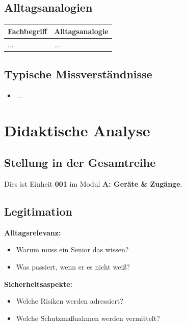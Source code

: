 \documentclass[11pt,a4paper]{article}
\newcommand{\einheitnummer}{001}                    %
\newcommand{\modulname}{Geräte \& Zugänge}          %
\newcommand{\modulbuchstabe}{A}
\begin{document}
\subsection{Alltagsanalogien}

\begin{tabular}{|l|l|}
\hline
\textbf{Fachbegriff} & \textbf{Alltagsanalogie} \\
\hline
... & ... \\
\hline
\end{tabular}

\subsection{Typische Missverständnisse}

\begin{itemize}
    \item ...
\end{itemize}

\section{Didaktische Analyse}

\subsection{Stellung in der Gesamtreihe}

Dies ist Einheit \textbf{\einheitnummer} im Modul \textbf{\modulbuchstabe: \modulname}.


\subsection{Legitimation}

\textbf{Alltagsrelevanz:}
\begin{itemize}
    \item Warum muss ein Senior das wissen?
    \item Was passiert, wenn er es nicht weiß?
\end{itemize}

\textbf{Sicherheitsaspekte:}
\begin{itemize}
    \item Welche Risiken werden adressiert?
    \item Welche Schutzmaßnahmen werden vermittelt?
\end{itemize}
\end{document}
